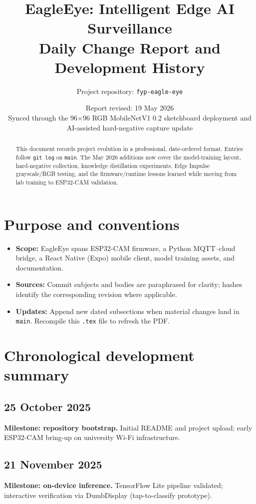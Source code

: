 \documentclass[11pt,a4paper]{article}
\title{\textbf{EagleEye: Intelligent Edge AI Surveillance}\\[0.35em]
\large Daily Change Report and Development History}
\author{Project repository: \texttt{fyp-eagle-eye}}
\date{Report revised: 19 May 2026 \\ \small Synced through the 96$\times$96 RGB MobileNetV1 0.2 sketchboard deployment and AI-assisted hard-negative capture update}
\begin{document}
\maketitle

\begin{abstract}
This document records project evolution in a professional, date-ordered format. Entries follow \texttt{git log} on \texttt{main}. The May 2026 additions now cover the model-training layout, hard-negative collection, knowledge distillation experiments, Edge Impulse grayscale/RGB testing, and the firmware/runtime lessons learned while moving from lab training to ESP32-CAM validation.
\end{abstract}

\tableofcontents
\newpage

\section{Purpose and conventions}
\begin{itemize}[nosep]
  \item \textbf{Scope:} EagleEye spans ESP32-CAM firmware, a Python MQTT--cloud bridge, a React Native (Expo) mobile client, model training assets, and documentation.
  \item \textbf{Sources:} Commit subjects and bodies are paraphrased for clarity; hashes identify the corresponding revision where applicable.
  \item \textbf{Updates:} Append new dated subsections when material changes land in \texttt{main}. Recompile this \texttt{.tex} file to refresh the PDF.
\end{itemize}

\section{Chronological development summary}

\subsection{25 October 2025}
\textbf{Milestone: repository bootstrap.} Initial README and project upload; early ESP32-CAM bring-up on university Wi-Fi infrastructure.

\subsection{21 November 2025}
\textbf{Milestone: on-device inference.} TensorFlow Lite pipeline validated; interactive verification via DumbDisplay (tap-to-classify prototype).
\end{document}
